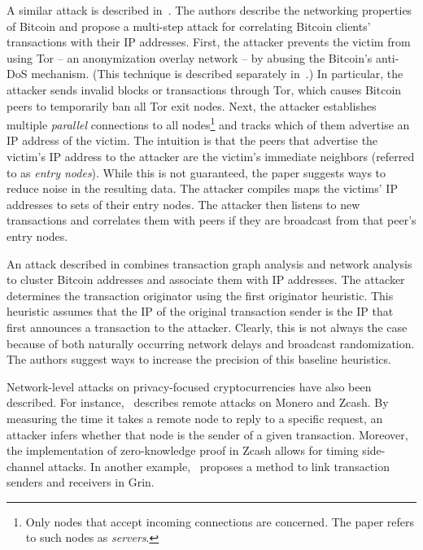A similar attack is described in~\cite{Biryukov2014}.
The authors describe the networking properties of Bitcoin and propose a multi-step attack for correlating Bitcoin clients' transactions with their IP addresses.
First, the attacker  prevents the victim from using Tor -- an anonymization overlay network -- by abusing the Bitcoin's anti-DoS mechanism.
(This technique is described separately in~\cite{Biryukov2015}.)
In particular, the attacker sends invalid blocks or transactions through Tor, which causes Bitcoin peers to temporarily ban all Tor exit nodes.
Next, the attacker establishes multiple \textit{parallel} connections to all nodes\footnote{Only nodes that accept incoming connections are concerned. The paper refers to such nodes as \textit{servers}.} and tracks which of them advertise an IP address of the victim.
The intuition is that the peers that advertise the victim's IP address to the attacker are the victim's immediate neighbors (referred to as \textit{entry nodes}).
While this is not guaranteed, the paper suggests ways to reduce noise in the resulting data.
The attacker compiles maps the victims' IP addresses to sets of their entry nodes.
The attacker then listens to new transactions and correlates them with peers if they are broadcast from that peer's entry nodes.

An attack described in \cite{Neudecker2017} combines transaction graph analysis and network analysis to cluster Bitcoin addresses and associate them with IP addresses.
The attacker determines the transaction originator using the first originator heuristic.
This heuristic assumes that the IP of the original transaction sender is the IP that first announces a transaction to the attacker.
Clearly, this is not always the case because of both naturally occurring network delays and broadcast randomization.
The authors suggest ways to increase the precision of this baseline heuristics.

Network-level attacks on privacy-focused cryptocurrencies have also been described.
For instance,~\cite{Tramer2020} describes remote attacks on Monero and Zcash.
By measuring the time it takes a remote node to reply to a specific request, an attacker infers whether that node is the sender of a given transaction.
Moreover, the implementation of zero-knowledge proof in Zcash allows for timing side-channel attacks.
In another example,~\cite{Bogatyy2019} proposes a method to link transaction senders and receivers in Grin.








